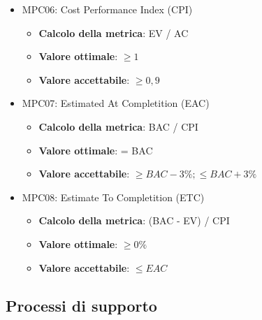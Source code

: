 \documentclass[12pt]{article}
\begin{document}
\begin{itemize}
	\item MPC06: Cost Performance Index (CPI)
	      \begin{itemize}
		      \item \textbf{Calcolo della metrica}:  EV / AC
		      \item \textbf{Valore ottimale}: $\ge 1$
		      \item \textbf{Valore accettabile}: $\ge 0,9$
	      \end{itemize}

	\item MPC07: Estimated At Completition (EAC)
	      \begin{itemize}
		      \item \textbf{Calcolo della metrica}:  BAC / CPI
		      \item \textbf{Valore ottimale}: = BAC
		      \item \textbf{Valore accettabile}: $\ge BAC - 3\% ; \le BAC + 3\% $
	      \end{itemize}
	\item MPC08: Estimate To Completition (ETC)
	      \begin{itemize}
		      \item \textbf{Calcolo della metrica}:  (BAC - EV) / CPI
		      \item \textbf{Valore ottimale}: $\ge 0\%$
		      \item \textbf{Valore accettabile}: $\le EAC$
	      \end{itemize}
\end{itemize}

\subsection{Processi di supporto}
\end{document}
